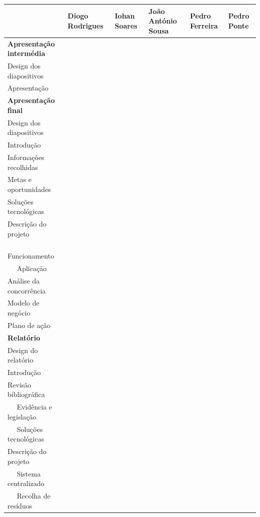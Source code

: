 \documentclass[11pt, a4paper, oneside]{book}
\newcommand*\checkmark{%
  \ding{52}%
}
\begin{document}
\begin{appendices}
\begin{center}
    \begin{tabular}{@{} p{12.9em}|p{4.6em}|p{4.6em}|p{4.6em}|p{4.6em}|p{4.6em} @{}}
        & \textbf{Diogo ~ Rodrigues} & \textbf{Iohan ~ Soares} & \textbf{João António Sousa} & \textbf{Pedro Ferreira} & \textbf{Pedro Ponte} \\ \hline
        \textbf{Apresentação intermédia} & & & & \\
        Design dos diapositivos & \checkmark & & & & \\
        Apresentação & & & \checkmark & & \\ \hline
        \textbf{Apresentação final} & & & & \\
        Design dos diapositivos & \checkmark & & & \checkmark & \\
        Introdução & & & & \checkmark & \\
        Informações recolhidas & & & & \checkmark & \\
        Metas e oportunidades & & \checkmark & \checkmark & & \\
        Soluções tecnológicas & \checkmark & & & & \\
        Descrição do projeto & & & & \\
        ~~ Funcionamento & \checkmark & & & & \checkmark \\
        ~~ Aplicação & & & \checkmark & & \\
        Análise da concorrência & \checkmark & & & & \\
        Modelo de negócio & & & \checkmark & & \\
        Plano de ação & & & & & \checkmark \\ \hline
        \textbf{Relatório} & & & & & \\
        Design do relatório & \checkmark & & & & \\
        Introdução & \checkmark & \checkmark & \checkmark & \checkmark & \checkmark \\
        Revisão bibliográfica & & & & & \\
        ~~ Evidência e legislação & & \checkmark & \checkmark & & \\
        ~~ Soluções tecnológicas & \checkmark & & & & \\
        Descrição do projeto & & & & & \\
        ~~ Sistema centralizado & \checkmark & & & & \\
        ~~ Recolha de resíduos & \checkmark & & & & \checkmark \\

\end{tabular}
\end{center}
\end{appendices}
\end{document}
